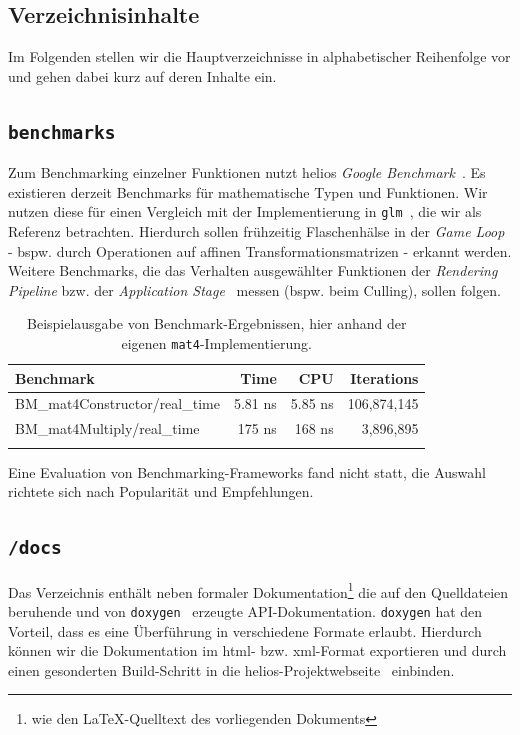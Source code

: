\subsection{Verzeichnisinhalte}

Im Folgenden stellen wir die Hauptverzeichnisse in alphabetischer Reihenfolge vor und gehen dabei kurz auf deren Inhalte ein.


\subsection*{\texttt{benchmarks}}
Zum Benchmarking einzelner Funktionen nutzt helios \textit{Google Benchmark}~\cite[]{googlebenchmarkgithub}.
Es existieren derzeit Benchmarks für mathematische Typen und Funktionen.
Wir nutzen diese für einen Vergleich mit der Implementierung in \texttt{glm}~\cite[]{glmGithub}, die wir als Referenz betrachten.
Hierdurch sollen frühzeitig Flaschenhälse in der \textit{Game Loop} - bspw. durch Operationen auf affinen Transformationsmatrizen - erkannt werden.
Weitere Benchmarks, die das Verhalten ausgewählter Funktionen der \textit{Rendering Pipeline} bzw. der \textit{Application Stage}~\cite[687]{Gre19} messen (bspw. beim Culling), sollen folgen.




\setlength{\tabcolsep}{8pt}
\begin{table}[t]
    \centering
    {\renewcommand{\arraystretch}{1.2}%
    \begin{tabular}{lrrr}
        \hline
        \textbf{Benchmark} & \textbf{Time} & \textbf{CPU} & \textbf{Iterations} \\
        \hline
        BM\_mat4Constructor/real\_time         & 5.81 ns  & 5.85 ns  & 106{,}874{,}145 \\
        BM\_mat4Multiply/real\_time            & 175 ns   & 168 ns   & 3{,}896{,}895 \\
        \hline\\
    \end{tabular}}
    \caption{Beispielausgabe von Benchmark-Ergebnissen, hier anhand der eigenen \texttt{mat4}-Implementierung.}
    \label{tab:mat4-benchmark}
\end{table}


Eine Evaluation von Benchmarking-Frameworks fand nicht statt, die Auswahl richtete sich nach Popularität und Empfehlungen.

\subsection*{\texttt{/docs}}
Das Verzeichnis enthält neben formaler Dokumentation\footnote{wie den \LaTeX-Quelltext des vorliegenden Dokuments} die auf den Quelldateien beruhende und von \texttt{doxygen}~\cite[]{Doxygen} erzeugte API-Dokumentation.
\texttt{doxygen} hat den Vorteil, dass es eine Überführung in verschiedene Formate erlaubt.
Hierdurch können wir die Dokumentation im html- bzw. xml-Format exportieren und durch einen gesonderten Build-Schritt in die helios-Projektwebseite~\cite[]{helios} einbinden.\par

